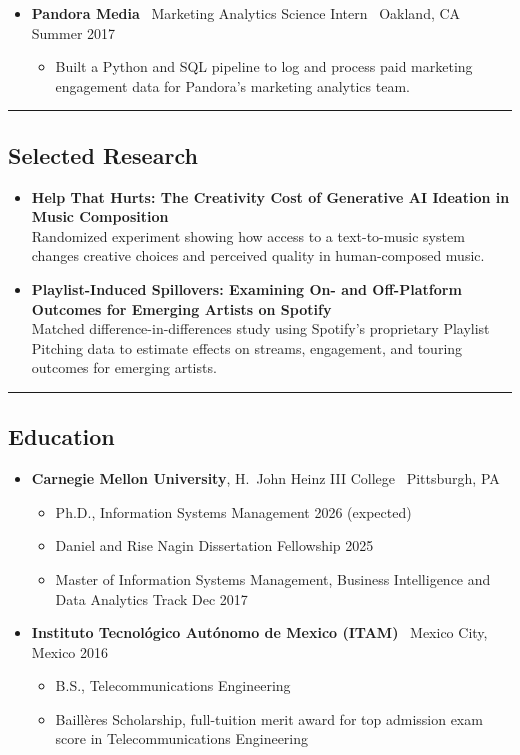 \documentclass[10pt,letterpaper]{article}
\newcommand{\sep}{{\color{gray}\,\textbullet\,\,}}
\newcommand{\hsep}{\noindent\textcolor{gray}{\rule{\textwidth}{0.5pt}}}
\newcommand{\block}[1]{\begin{samepage}\hsep\subsection*{#1}\end{samepage}}
\begin{document}
\begin{itemize}[leftmargin=0pt, label={}]
\begin{itemize}
  \item Maintained KPI tracking, dashboards, and MAU reporting and forecasting workflows; used Hive and Airflow to support recurring targeting datasets and Tableau to monitor campaign performance.
  \end{itemize}
\item \textbf{Pandora Media} \sep Marketing Analytics Science Intern \sep Oakland, CA \hfill Summer 2017
  \begin{itemize}
  \item Built a Python and SQL pipeline to log and process paid marketing engagement data for Pandora's marketing analytics team.
  \end{itemize}
\end{itemize}

\block{Selected Research}

\begin{itemize}[leftmargin=0pt, label={}]
\item \textbf{Help That Hurts: The Creativity Cost of Generative AI Ideation in Music Composition} \\
Randomized experiment showing how access to a text-to-music system changes creative choices and perceived quality in human-composed music.
\item \textbf{Playlist-Induced Spillovers: Examining On- and Off-Platform Outcomes for Emerging Artists on Spotify} \\
Matched difference-in-differences study using Spotify's proprietary Playlist Pitching data to estimate effects on streams, engagement, and touring outcomes for emerging artists.
\end{itemize}

\block{Education}

\begin{itemize}[leftmargin=0pt, label={}]
\item \textbf{Carnegie Mellon University}, H.\ John Heinz III College \sep Pittsburgh, PA
  \begin{itemize}[label={}]
  \item Ph.D., Information Systems Management \hfill 2026 (expected)
  \item Daniel and Rise Nagin Dissertation Fellowship \hfill 2025
  \item Master of Information Systems Management, Business Intelligence and Data Analytics Track \hfill Dec 2017
  \end{itemize}
\item \textbf{Instituto Tecnol\'ogico Aut\'onomo de Mexico (ITAM)} \sep Mexico City, Mexico \hfill 2016
  \begin{itemize}[label={}]
  \item B.S., Telecommunications Engineering
  \item Baill\`eres Scholarship, full-tuition merit award for top admission exam score in Telecommunications Engineering
  \end{itemize}
\end{itemize}
\end{document}
